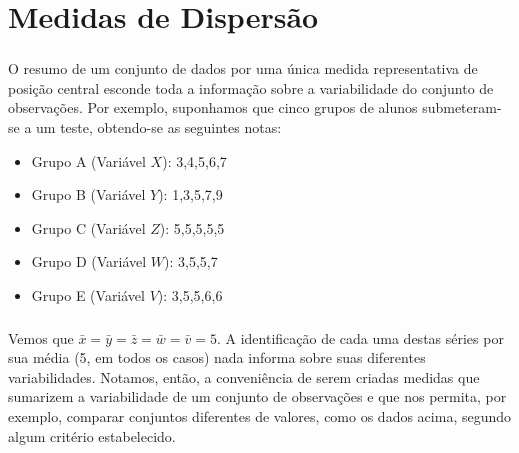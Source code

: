 \documentclass[14pt,aspectratio=1610]{beamer}
\begin{document}
\section{Medidas de Dispersão}
\begin{frame}{}
\frametitle{}
\begin{block}{}
\justifying
O resumo de um conjunto de dados por uma única medida representativa de posição
central esconde toda a informação sobre a variabilidade do conjunto de observações.
Por exemplo, suponhamos que cinco grupos de alunos submeteram-se a um
teste, obtendo-se as seguintes notas:
\begin{itemize}
\item Grupo A (Variável $X$): 3,4,5,6,7
\item Grupo B (Variável $Y$): 1,3,5,7,9
\item Grupo C (Variável $Z$): 5,5,5,5,5
\item Grupo D (Variável $W$): 3,5,5,7
\item Grupo E (Variável $V$): 3,5,5,6,6
\end{itemize}
\end{block}
\end{frame}

\begin{frame}{}
\frametitle{}
\begin{block}{}
\justifying
Vemos que $\bar{x}=\bar{y}=\bar{z}=\bar{w}=\bar{v}=5$. A identificação de cada uma destas séries por sua
média (5, em todos os casos) nada informa sobre suas diferentes variabilidades. Notamos, então, a conveniência de serem criadas medidas que sumarizem a variabilidade de um conjunto de observações e que nos permita, por exemplo, comparar conjuntos diferentes de valores, como os dados acima, segundo algum critério estabelecido.
\end{block}
\end{frame}

\end{document}
